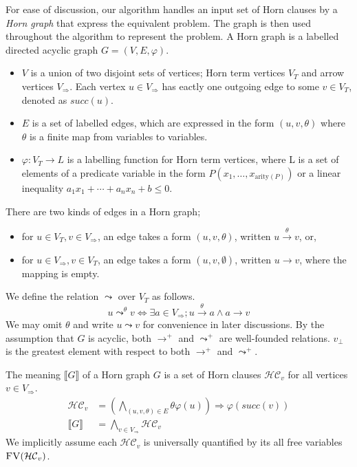 \documentclass[master,final,12pt]{iscs-thesis}
\newcommand{\edge}[2]{#1\rightarrow#2}
\newcommand{\edgel}[3]{#1\xrightarrow{#2}#3}
\begin{document}
For ease of discussion, our algorithm handles an input set of Horn
clauses by a \emph{Horn graph} that express the equivalent problem.
The graph is then used throughout the algorithm to represent the
problem.  A Horn graph is a labelled directed acyclic graph
$G=(V,E,\varphi)$.
\begin{itemize}
\item $V$ is a union of two disjoint sets of vertices; Horn term
  vertices $V_T$ and arrow vertices $V_\Rightarrow$.  Each vertex $u
  \in V_\Rightarrow$ has eactly one outgoing edge to some $v \in V_T$,
  denoted as $succ(u)$.
\item $E$ is a set of labelled edges, which are expressed in the form
  $(u,v,\theta)$ where $\theta$ is a finite map from variables to
  variables.
\item $\varphi: V_T \rightarrow L$ is a labelling function for Horn
  term vertices, where L is a set of elements of a predicate variable
  in the form $P(x_1, \ldots, x_{\mathrm{arity}(P)})$ or a linear
  inequality $a_1 x_1 + \cdots + a_n x_n + b \leq 0$.
\end{itemize}
There are two kinds of edges in a Horn graph;
\begin{itemize}
\item for $u \in V_T, v \in V_\Rightarrow$, an edge takes a form
  $(u,v,\theta)$, written $\edgel{u}{\theta}{v}$, or,
\item for $u \in V_\Rightarrow, v \in V_T$, an edge takes a form
  $(u,v,\emptyset)$, written $\edge{u}{v}$, where the mapping is
  empty.
\end{itemize}

We define the relation $\leadsto$ over $V_T$ as follows.
\[ u \mathop{\leadsto}^\theta v \Longleftrightarrow \exists a \in V_\Rightarrow;
\edgel{u}{\theta}{a} \wedge \edge{a}{v} \] We may omit $\theta$ and
write $u \leadsto v$ for convenience in later discussions. By the
assumption that $G$ is acyclic, both $\rightarrow^+$ and $\leadsto^+$ are
well-founded relations. $v_\bot$ is the greatest element with respect
to both $\rightarrow^+$ and $\leadsto^+$.

The meaning $\llbracket G \rrbracket $ of a Horn graph $G$ is a set of
Horn clauses $\mathcal{HC}_v$ for all vertices $v \in V_\Rightarrow$.
\begin{align*}
\mathcal{HC}_v & = \left( \bigwedge_{(u,v,\theta) \in E} \theta \varphi(u) \right) \Longrightarrow \varphi(succ(v)) \\
\llbracket G \rrbracket & = \bigwedge_{v \in V_\Rightarrow} \mathcal{HC}_v
\end{align*}
We implicitly assume each $\mathcal{HC}_v$ is universally quantified
by its all free variables $\textsc{FV}(\mathcal{HC}_v)$.
\end{document}
